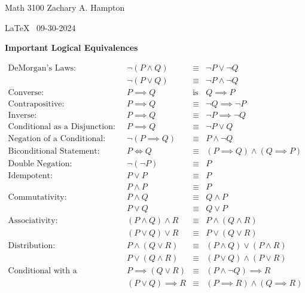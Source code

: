 \documentclass[12pt]{article}
\begin{document}
Math 3100 \hfill Zachary A. Hampton

\LaTeX~ \hfill 
09-30-2024

\bigskip

\begin{center}
    \textbf{Important Logical Equivalences}
\end{center}

\[
\begin{array}{rrcl}
\text{DeMorgan's Laws:} & \neg(P \land Q) & \equiv & \neg P \lor \neg Q \\
                         & \neg(P \lor Q) & \equiv & \neg P \land \neg Q \\[10pt]

\text{Converse:} & P \implies Q & \text{is} & Q \implies P \\[10pt]
                         
\text{Contrapositive:} & P \implies Q & \equiv & \neg Q \implies \neg P \\[10pt]

\text{Inverse:} & P \implies Q & \equiv & \neg P \implies \neg Q \\[10pt]

\text{Conditional as a Disjunction:} & P \implies Q & \equiv & \neg P \lor Q \\[10pt]

\text{Negation of a Conditional:} & \neg(P \implies Q) & \equiv & P \land \neg Q \\[10pt]

\text{Biconditional Statement:} & P \iff Q & \equiv & (P \implies Q) \land (Q \implies P) \\[10pt]

\text{Double Negation:} & \neg(\neg P) & \equiv & P \\[10pt]

\text{Idempotent:} & P \lor P & \equiv & P \\ 
                   & P \land P & \equiv & P \\[10pt]

\text{Commutativity:} & P \land Q & \equiv & Q \land P \\ 
                      & P \lor Q & \equiv & Q \lor P \\[10pt]

\text{Associativity:} & (P \land Q) \land R & \equiv & P \land (Q \land R) \\
                      & (P \lor Q) \lor R & \equiv & P \lor (Q \lor R) \\[10pt]

\text{Distribution:} & P \land (Q \lor R) & \equiv & (P \land Q) \lor (P \land R) \\
                     & P \lor (Q \land R) & \equiv & (P \lor Q) \land (P \lor R) \\[10pt]

\text{Conditional with a Disjunction:} & P \implies (Q \lor R) & \equiv & (P \land \neg Q) \implies R \\
                                       & (P \lor Q) \implies R & \equiv & (P \implies R) \land (Q \implies R)
\end{array}
\]
\end{document}
